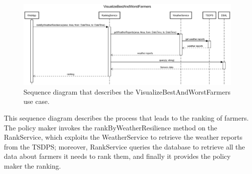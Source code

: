 \documentclass{article}
\begin{document}
\newpage
\begin{figure}[H]
   \centering
   \includegraphics[scale=0.30]{diagrams/sequence diagrams/VisualizeBestAndWorstFarmers.png}
    \caption{Sequence diagram that describes the VisualizeBestAndWorstFarmers use case.}
\end{figure}
This sequence diagram describes the process that leads to the ranking of farmers. The policy maker invokes the rankByWeatherResilience method on the RankService, which exploits the WeatherService to retrieve the weather reports from the TSDPS; moreover, RankService queries the database to retrieve all the data about farmers it needs to rank them, and finally it provides the policy maker the ranking.
\end{document}
